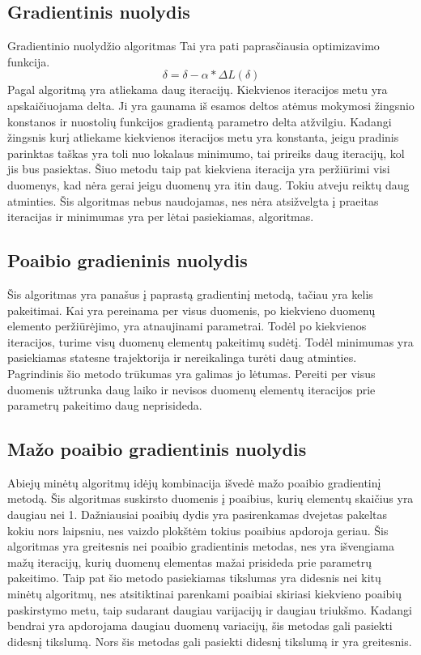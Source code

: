 \documentclass{VUMIFInfKursinis}
\begin{document}
\subsection{Gradientinis nuolydis}
Gradientinio nuolydžio algoritmas
Tai yra pati paprasčiausia optimizavimo funkcija.
\[
\delta = \delta - \alpha * \Delta L (\delta)
\]
Pagal algoritmą yra atliekama daug iteracijų. Kiekvienos iteracijos metu yra
apskaičiuojama delta. Ji yra gaunama iš esamos deltos atėmus mokymosi žingsnio konstanos
ir nuostolių funkcijos gradientą parametro delta atžvilgiu. Kadangi žingsnis kurį
atliekame kiekvienos iteracijos metu yra konstanta, jeigu pradinis parinktas taškas
yra toli nuo lokalaus minimumo, tai prireiks daug iteracijų, kol jis bus pasiektas.
Šiuo metodu taip pat kiekviena iteracija yra peržiūrimi visi duomenys, kad nėra
gerai jeigu duomenų yra itin daug. Tokiu atveju reiktų daug atminties. Šis algoritmas nebus naudojamas, nes nėra
atsižvelgta į praeitas iteracijas ir minimumas yra per lėtai pasiekiamas, algoritmas.

\subsection{Poaibio gradieninis nuolydis}
 Šis algoritmas yra panašus į paprastą gradientinį metodą, tačiau yra kelis pakeitimai.
 Kai yra pereinama per visus duomenis, po kiekvieno duomenų elemento peržiūrėjimo,
 yra atnaujinami parametrai. Todėl po kiekvienos iteracijos, turime visų duomenų
 elementų pakeitimų sudėtį. Todėl minimumas yra pasiekiamas statesne trajektorija ir
 nereikalinga turėti daug atminties. Pagrindinis šio metodo trūkumas yra galimas jo
 lėtumas. Pereiti per visus duomenis užtrunka daug laiko ir nevisos duomenų elementų
 iteracijos prie parametrų pakeitimo daug neprisideda.

\subsection{Mažo poaibio gradientinis nuolydis}
Abiejų minėtų algoritmų idėjų kombinacija išvedė mažo poaibio gradientinį metodą.
Šis algoritmas suskirsto duomenis į poaibius, kurių elementų skaičius yra daugiau nei 1.
Dažniausiai poaibių dydis yra pasirenkamas dvejetas pakeltas kokiu nors laipsniu, nes
vaizdo plokštėm tokius poaibius apdoroja geriau. Šis algoritmas yra greitesnis nei poaibio
gradientinis metodas, nes yra išvengiama mažų iteracijų, kurių duomenų elementas mažai
prisideda prie parametrų pakeitimo. Taip pat šio metodo pasiekiamas tikslumas yra didesnis
nei kitų minėtų algoritmų, nes atsitiktinai parenkami poaibiai skiriasi kiekvieno
poaibių paskirstymo metu, taip sudarant daugiau varijacijų ir daugiau triukšmo. Kadangi
bendrai yra apdorojama daugiau duomenų variacijų, šis metodas gali pasiekti didesnį
tikslumą. Nors šis metodas gali pasiekti didesnį tikslumą ir yra greitesnis.
\end{document}
